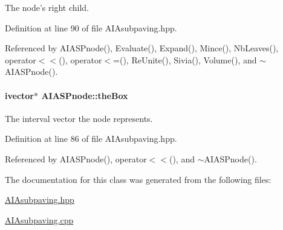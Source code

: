 \-The node's right child. 



\-Definition at line 90 of file \-A\-I\-Asubpaving.\-hpp.



\-Referenced by \-A\-I\-A\-S\-Pnode(), \-Evaluate(), \-Expand(), \-Mince(), \-Nb\-Leaves(), operator$<$$<$(), operator$<$=(), \-Re\-Unite(), \-Sivia(), \-Volume(), and $\sim$\-A\-I\-A\-S\-Pnode().

\hypertarget{classAIASPnode_ab904c07918618a89d5511fbaf87f5143}{
\paragraph[{the\-Box}]{\setlength{\rightskip}{0pt plus 5cm}ivector$\ast$ {\bf \-A\-I\-A\-S\-Pnode\-::the\-Box}}}\label{classAIASPnode_ab904c07918618a89d5511fbaf87f5143}


\-The interval vector the node represents. 



\-Definition at line 86 of file \-A\-I\-Asubpaving.\-hpp.



\-Referenced by \-A\-I\-A\-S\-Pnode(), operator$<$$<$(), and $\sim$\-A\-I\-A\-S\-Pnode().



\-The documentation for this class was generated from the following files\-:\begin{DoxyCompactItemize}
\item 
\hyperlink{AIAsubpaving_8hpp}{\-A\-I\-Asubpaving.\-hpp}\item 
\hyperlink{AIAsubpaving_8cpp}{\-A\-I\-Asubpaving.\-cpp}\end{DoxyCompactItemize}
